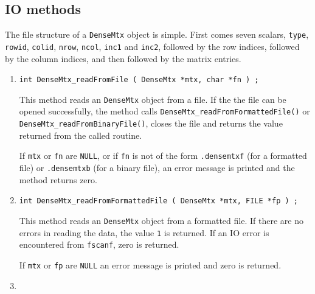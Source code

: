 \subsection{IO methods}
\label{subsection:DenseMtx:proto:IO}
\par
The file structure of a {\tt DenseMtx} object is simple.
First comes seven scalars, {\tt type}, {\tt rowid}, {\tt colid},
{\tt nrow}, {\tt ncol}, {\tt inc1} and {\tt inc2},
followed by the row indices,
followed by the column indices, and then
followed by the matrix entries.
\par
\begin{enumerate}
\item
\begin{verbatim}
int DenseMtx_readFromFile ( DenseMtx *mtx, char *fn ) ;
\end{verbatim}
\par
This method reads an {\tt DenseMtx} object from a file.
If the the file can be opened successfully,
the method calls {\tt DenseMtx\_readFromFormattedFile()} or
{\tt DenseMtx\_readFromBinaryFile()},
closes the file
and returns the value returned from the called routine.
\par {}
If {\tt mtx} or {\tt fn} are {\tt NULL},
or if {\tt fn} is not of the form
{\tt *.densemtxf} (for a formatted file)
or {\tt *.densemtxb} (for a binary file),
an error message is printed and the method returns zero.
\item
\begin{verbatim}
int DenseMtx_readFromFormattedFile ( DenseMtx *mtx, FILE *fp ) ;
\end{verbatim}
\par
This method reads an {\tt DenseMtx} object from a formatted file.
If there are no errors in reading the data,
the value {\tt 1} is returned.
If an IO error is encountered from {\tt fscanf}, zero is returned.
\par {}
If {\tt mtx} or {\tt fp} are {\tt NULL}
an error message is printed and zero is returned.
\item
\begin{verbatim}

\end{verbatim}
\end{enumerate}
